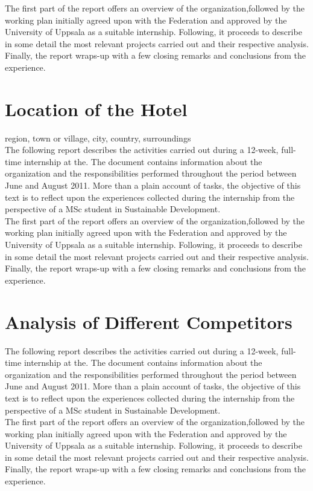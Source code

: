 \documentclass[12pt,onecolumn,a4paper]{IEEEtran}
\begin{document}
The first part of the report offers an overview of the organization,followed by the working plan initially agreed upon with the Federation and approved by the University of Uppsala as a suitable internship. Following, it proceeds to describe in some detail the most relevant projects carried out and their respective analysis. Finally, the report
wraps-up with a few closing remarks and conclusions from the experience.

\newpage
\section{\textbf{Location of the Hotel}}
 region, town or village, city, country, surroundings\\
 
The following report describes the activities carried out during a 12-week, full-time internship at the. The document contains information about the organization and the responsibilities performed throughout the period between June and August 2011. More than a plain account of tasks, the objective of this text is to reflect upon the experiences collected during the internship from the perspective of a MSc student in
Sustainable Development.\\

The first part of the report offers an overview of the organization,followed by the working plan initially agreed upon with the Federation and approved by the University of Uppsala as a suitable internship. Following, it proceeds to describe in some detail the most relevant projects carried out and their respective analysis. Finally, the report
wraps-up with a few closing remarks and conclusions from the experience.

\newpage
\section{\textbf{Analysis of Different Competitors}}
The following report describes the activities carried out during a 12-week, full-time internship at the. The document contains information about the organization and the responsibilities performed throughout the period between June and August 2011. More than a plain account of tasks, the objective of this text is to reflect upon the experiences collected during the internship from the perspective of a MSc student in
Sustainable Development.\\

The first part of the report offers an overview of the organization,followed by the working plan initially agreed upon with the Federation and approved by the University of Uppsala as a suitable internship. Following, it proceeds to describe in some detail the most relevant projects carried out and their respective analysis. Finally, the report
wraps-up with a few closing remarks and conclusions from the experience.
\end{document}
